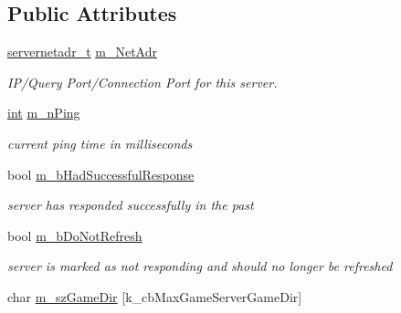 \subsection*{Public Attributes}
\begin{DoxyCompactItemize}
\item 
\hypertarget{classgameserveritem__t_a2eb6dddf2404c1d56a5fbefc5bb447a8}{}\hyperlink{classservernetadr__t}{servernetadr\+\_\+t} \hyperlink{classgameserveritem__t_a2eb6dddf2404c1d56a5fbefc5bb447a8}{m\+\_\+\+Net\+Adr}\label{classgameserveritem__t_a2eb6dddf2404c1d56a5fbefc5bb447a8}

\begin{DoxyCompactList}\small\item\em I\+P/\+Query Port/\+Connection Port for this server. \end{DoxyCompactList}\item 
\hypertarget{classgameserveritem__t_a1cac2eecd77845d91dccfdf6a28cbc56}{}\hyperlink{SDL__thread_8h_a6a64f9be4433e4de6e2f2f548cf3c08e}{int} \hyperlink{classgameserveritem__t_a1cac2eecd77845d91dccfdf6a28cbc56}{m\+\_\+n\+Ping}\label{classgameserveritem__t_a1cac2eecd77845d91dccfdf6a28cbc56}

\begin{DoxyCompactList}\small\item\em current ping time in milliseconds \end{DoxyCompactList}\item 
\hypertarget{classgameserveritem__t_afbcb314e49e004fd186f55ac9d0094ee}{}bool \hyperlink{classgameserveritem__t_afbcb314e49e004fd186f55ac9d0094ee}{m\+\_\+b\+Had\+Successful\+Response}\label{classgameserveritem__t_afbcb314e49e004fd186f55ac9d0094ee}

\begin{DoxyCompactList}\small\item\em server has responded successfully in the past \end{DoxyCompactList}\item 
\hypertarget{classgameserveritem__t_a6d322858126f5f3125ea8a7589ef9bce}{}bool \hyperlink{classgameserveritem__t_a6d322858126f5f3125ea8a7589ef9bce}{m\+\_\+b\+Do\+Not\+Refresh}\label{classgameserveritem__t_a6d322858126f5f3125ea8a7589ef9bce}

\begin{DoxyCompactList}\small\item\em server is marked as not responding and should no longer be refreshed \end{DoxyCompactList}\item 
\hypertarget{classgameserveritem__t_a6a9703b2c9b6a7f3b847c7a321b409fb}{}char \hyperlink{classgameserveritem__t_a6a9703b2c9b6a7f3b847c7a321b409fb}{m\+\_\+sz\+Game\+Dir} \mbox{[}k\+\_\+cb\+Max\+Game\+Server\+Game\+Dir\mbox{]}\label{classgameserveritem__t_a6a9703b2c9b6a7f3b847c7a321b409fb}


\end{DoxyCompactItemize}
